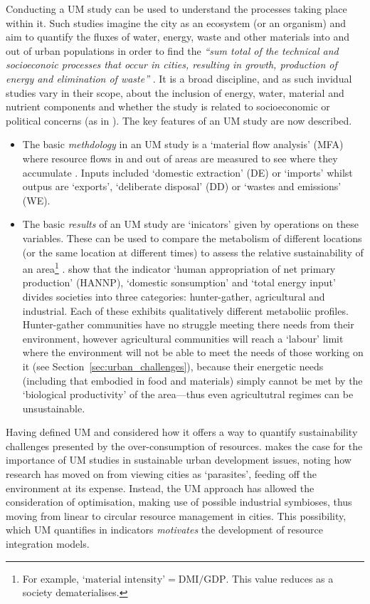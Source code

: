 Conducting a UM study can be used to understand the processes taking place within it. Such studies imagine the city as an ecosystem (or an organism) and aim to quantify the fluxes of water, energy, waste and other materials into and out of urban populations in order to find the \emph{``sum total of the technical and socioeconoic processes that occur in cities, resulting in growth, production of energy and elimination of waste''} \citep[p. 44]{Kennedy2008}. It is a broad discipline, and as such invidual studies vary in their scope, about the inclusion of energy, water, material and nutrient components and whether the study is related to socioeconomic or political concerns (as in \citet{Hobbes2007}). The key features of an UM study are now described.
\begin{itemize}
	\item The basic \emph{methdology} in an UM study is a `material flow analysis' (MFA) where resource flows in and out of areas are measured to see where they accumulate \citep{Barles2009}. Inputs included `domestic extraction' (DE) or `imports' whilst outpus are `exports', `deliberate disposal' (DD) or `wastes and emissions' (WE). 
	\item The basic \emph{results} of an UM study are `inicators' given by operations on these variables. These can be used to compare the metabolism of different locations (or the same location at different times) to assess the relative sustainability of an area\footnote{For example, $\mbox{`material intensity'}=\mbox{DMI}/\mbox{GDP}$. This value reduces as a society dematerialises.} \citep{Hobbes2005}. \citet{Haberl2001a, Haberl2001b} show that the indicator `human appropriation of net primary production' (HANNP), `domestic sonsumption' and `total energy input' divides societies into three categories: hunter-gather, agricultural and industrial. Each of these exhibits qualitatively different metaboliic profiles. Hunter-gather communities have no struggle meeting there needs from their environment, however agricultural communities will reach a `labour' limit where the environment will not be able to meet the needs of those working on it (see Section~\ref{sec:urban_challenges}), because their energetic needs (including that embodied in food and materials) simply cannot be met by the `biological productivity' of the area---thus even agricultutral regimes can be unsustainable. 
\end{itemize}
Having defined UM and considered how it offers a way to quantify sustainability challenges presented by the over-consumption of resources. \citet{Barles2010} makes the case for the importance of UM studies in sustainable urban development issues, noting how research has moved on from viewing cities as `parasites', feeding off the environment at its expense. Instead, the UM approach has allowed the consideration of optimisation, making use of possible industrial symbioses, thus moving from linear to circular resource management in cities. This possibility, which UM quantifies in indicators \emph{motivates} the development of resource integration models.

